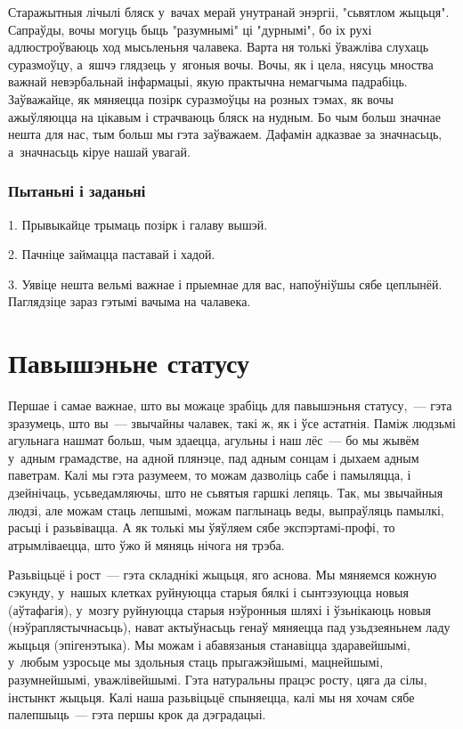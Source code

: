 Старажытныя лічылі бляск у~вачах мерай унутранай энэргіі, "сьвятлом жыцьця". Сапраўды, вочы могуць быць "разумнымі" ці "дурнымі", бо іх рухі адлюстроўваюць ход мысьленьня чалавека. Варта ня толькі ўважліва слухаць суразмоўцу, а~яшчэ глядзець у~ягоныя вочы. Вочы, як і цела, нясуць мноства важнай невэрбальнай інфармацыі, якую практычна немагчыма падрабіць. Заўважайце, як мяняецца позірк суразмоўцы на розных тэмах, як вочы ажыўляюцца на цікавым і страчваюць бляск на нудным. Бо чым больш значнае нешта для нас, тым больш мы гэта заўважаем. Дафамін адказвае за значнасьць, а~значнасьць кіруе нашай увагай.

\subsubsection{Пытаньні і заданьні}

1. Прывыкайце трымаць позірк і галаву вышэй.

2. Пачніце займацца паставай і хадой.

3. Уявіце нешта вельмі важнае і прыемнае для вас, напоўніўшы сябе цеплынёй. Паглядзіце зараз гэтымі вачыма на чалавека.


\section{Павышэньне статусу}

Першае і самае важнае, што вы можаце зрабіць для павышэньня статусу,~--- гэта зразумець, што вы~--- звычайны чалавек, такі ж, як і ўсе астатнія. Паміж людзьмі агульнага нашмат больш, чым здаецца, агульны і наш лёс~--- бо мы жывём у~адным грамадстве, на адной плянэце, пад адным сонцам і дыхаем адным паветрам. Калі мы гэта разумеем, то можам дазволіць сабе і памыляцца, і дзейнічаць, усьведамляючы, што не сьвятыя гаршкі лепяць. Так, мы звычайныя людзі, але можам стаць лепшымі, можам паглынаць веды, выпраўляць памылкі, расьці і разьвівацца. А як толькі мы ўяўляем сябе экспэртамі-профі, то атрымліваецца, што ўжо й мяняць нічога ня трэба.

Разьвіцьцё і рост~--- гэта складнікі жыцьця, яго аснова. Мы мяняемся кожную сэкунду, у~нашых клетках руйнуюцца старыя бялкі і сынтэзуюцца новыя (аўтафагія), у~мозгу руйнуюцца старыя нэўронныя шляхі і ўзьнікаюць новыя (нэўраплястычнасьць), нават актыўнасьць генаў мяняецца пад узьдзеяньнем ладу жыцьця (эпігенэтыка). Мы можам і абавязаныя станавіцца здаравейшымі, у~любым узросьце мы здольныя стаць прыгажэйшымі, мацнейшымі, разумнейшымі, уважлівейшымі. Гэта натуральны працэс росту, цяга да сілы, інстынкт жыцьця. Калі наша разьвіцьцё спыняецца, калі мы ня хочам сябе палепшыць~--- гэта першы крок да дэградацыі.

